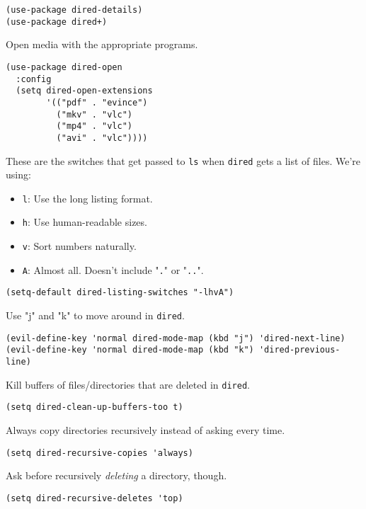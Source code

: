 \documentclass[11pt]{article}
\begin{document}
\begin{verbatim}
(use-package dired-details)
(use-package dired+)
\end{verbatim}

Open media with the appropriate programs.

\begin{verbatim}
(use-package dired-open
  :config
  (setq dired-open-extensions
        '(("pdf" . "evince")
          ("mkv" . "vlc")
          ("mp4" . "vlc")
          ("avi" . "vlc"))))
\end{verbatim}

These are the switches that get passed to \texttt{ls} when \texttt{dired} gets a list of
files. We’re using:

\begin{itemize}
\item \texttt{l}: Use the long listing format.
\item \texttt{h}: Use human-readable sizes.
\item \texttt{v}: Sort numbers naturally.
\item \texttt{A}: Almost all. Doesn't include "\texttt{.}" or "\texttt{..}".
\end{itemize}

\begin{verbatim}
(setq-default dired-listing-switches "-lhvA")
\end{verbatim}

Use "j" and "k" to move around in \texttt{dired}.

\begin{verbatim}
(evil-define-key 'normal dired-mode-map (kbd "j") 'dired-next-line)
(evil-define-key 'normal dired-mode-map (kbd "k") 'dired-previous-line)
\end{verbatim}

Kill buffers of files/directories that are deleted in \texttt{dired}.

\begin{verbatim}
(setq dired-clean-up-buffers-too t)
\end{verbatim}

Always copy directories recursively instead of asking every time.

\begin{verbatim}
(setq dired-recursive-copies 'always)
\end{verbatim}

Ask before recursively \emph{deleting} a directory, though.

\begin{verbatim}
(setq dired-recursive-deletes 'top)
\end{verbatim}
\end{document}

